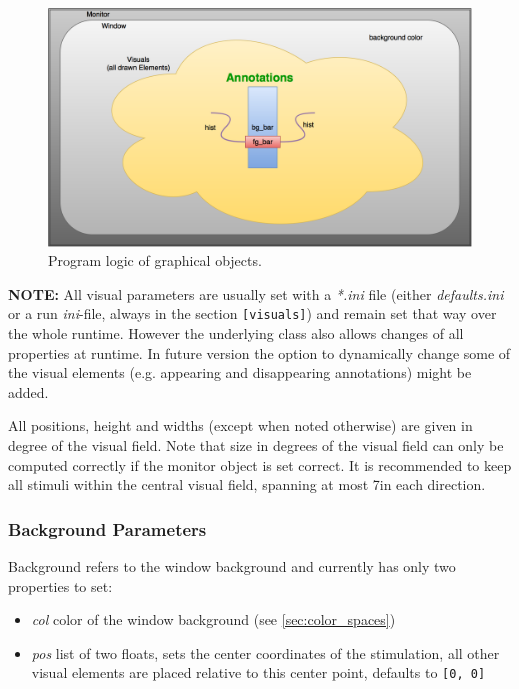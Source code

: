 \documentclass[12pt,a4paper]{book}
\begin{document}
\begin{figure}
\includegraphics[width = \linewidth]{ressources/urge_graph}
\caption{Program logic of graphical objects.}
\label{fig:graph_log}
\end{figure}

\textbf{NOTE:} All visual parameters are usually set with a \emph{*.ini} file (either \textit{defaults.ini} or a run \textit{ini}-file, always in the section \verb|[visuals]|) and remain set that way over the whole runtime. However the underlying class also allows changes of all properties at runtime. In future version the option to dynamically change some of the visual elements (e.g. appearing and disappearing annotations) might be added.

All positions, height and widths (except when noted otherwise) are given in degree of the visual field. Note that size in degrees of the visual field can only be computed correctly if the monitor object is set correct. It is recommended to keep all stimuli within the central visual field, spanning at most 7\degree  in each direction.

\subsubsection{Background Parameters}

Background refers to the window background and currently has only two properties to set:
\begin{itemize}
\item \textit{col} color of the window background (see \ref{sec:color_spaces})
\item \textit{pos} list of two floats, sets the center coordinates of the stimulation, all other visual elements are placed relative to this center point, defaults to \verb|[0, 0]|
\end{itemize}
\end{document}
